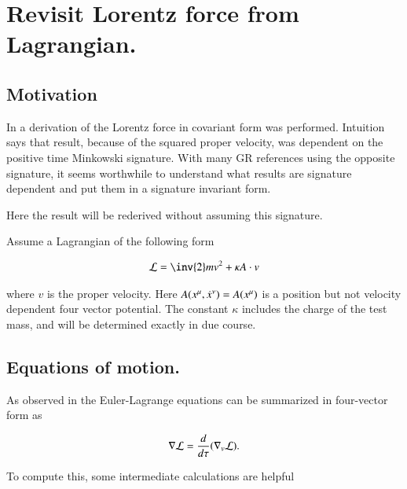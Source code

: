 \chapter{Revisit Lorentz force from Lagrangian.}\label{chap:PJSrLorentzForce}
\date{October 8, 2008.  lorentzForce.tex}

\section{Motivation }

In  a derivation of the Lorentz force in covariant
form was performed.  Intuition says that result, because of the squared
proper velocity, was dependent on the 
positive time Minkowski signature.
With many
GR references using the opposite signature, it seems worthwhile to understand
what results are signature dependent and put them in a signature invariant form.

Here the result will be rederived without assuming this signature.

Assume a Lagrangian of the following form

\begin{align}\label{eqn:lorForce:potlag}
\LL = \inv{2}m v^2 + \kappa A \cdot v
\end{align}

where $v$ is the proper velocity.  Here $A(x^\mu,\dot{x}^\nu) = A(x^\mu)$ is a position but not velocity dependent four vector potential.  The constant $\kappa$ includes the charge of the test mass, and will be determined exactly in due course.

\section{Equations of motion. }

As observed in  the Euler-Lagrange equations can be summarized in four-vector form as

\begin{align}
\nabla \mathcal{L} = \frac{d}{d\tau}(\nabla_v \mathcal{L}).
\end{align}

To compute this, some intermediate calculations are helpful

